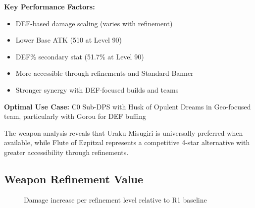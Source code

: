 \documentclass[12pt,a4paper]{article}
\begin{document}
\begin{tcolorbox}[colback=geoyellow!5, colframe=geoyellow, title=Flute of Ezpitzal (R5)]
\textbf{Key Performance Factors:}
\begin{itemize}
    \item DEF-based damage scaling (varies with refinement)
    \item Lower Base ATK (510 at Level 90)
    \item DEF\% secondary stat (51.7\% at Level 90)
    \item More accessible through refinements and Standard Banner
    \item Stronger synergy with DEF-focused builds and teams
\end{itemize}

\textbf{Optimal Use Case:} C0 Sub-DPS with Husk of Opulent Dreams in Geo-focused team, particularly with Gorou for DEF buffing
\end{tcolorbox}

The weapon analysis reveals that Uraku Misugiri is universally preferred when available, while Flute of Ezpitzal represents a competitive 4-star alternative with greater accessibility through refinements.

\subsection{Weapon Refinement Value}

\begin{figure}[H]
\centering
{}
\caption{Damage increase per refinement level relative to R1 baseline}
\label{fig:refinement_value}
\end{figure}
\end{document}
